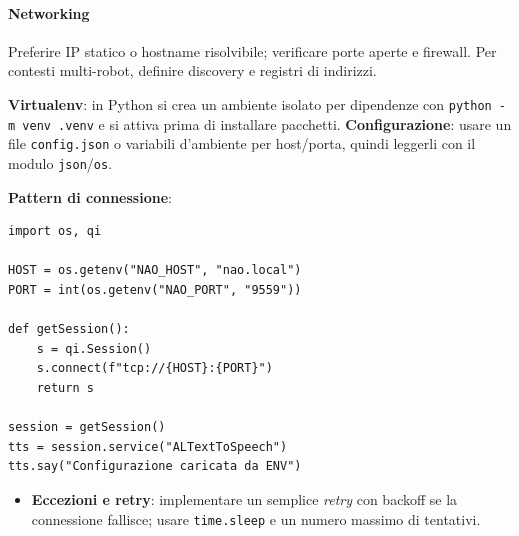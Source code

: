 \paragraph{Networking} Preferire IP statico o hostname risolvibile; verificare porte aperte e firewall. Per contesti multi-robot, definire discovery e registri di indirizzi.

\begin{tcolorbox}[title=Spiegazione per sviluppatori non-Python]
\textbf{Virtualenv}: in Python si crea un ambiente isolato per dipendenze con \texttt{python -m venv .venv} e si attiva prima di installare pacchetti.  
\textbf{Configurazione}: usare un file \texttt{config.json} o variabili d'ambiente per host/porta, quindi leggerli con il modulo \texttt{json}/\texttt{os}.

\textbf{Pattern di connessione}:
\begin{lstlisting}
import os, qi

HOST = os.getenv("NAO_HOST", "nao.local")
PORT = int(os.getenv("NAO_PORT", "9559"))

def getSession():
    s = qi.Session()
    s.connect(f"tcp://{HOST}:{PORT}")
    return s

session = getSession()
tts = session.service("ALTextToSpeech")
tts.say("Configurazione caricata da ENV")
\end{lstlisting}

\begin{itemize}
  \item \textbf{Eccezioni e retry}: implementare un semplice \emph{retry} con backoff se la connessione fallisce; usare \texttt{time.sleep} e un numero massimo di tentativi.
\end{itemize}
\end{tcolorbox}
